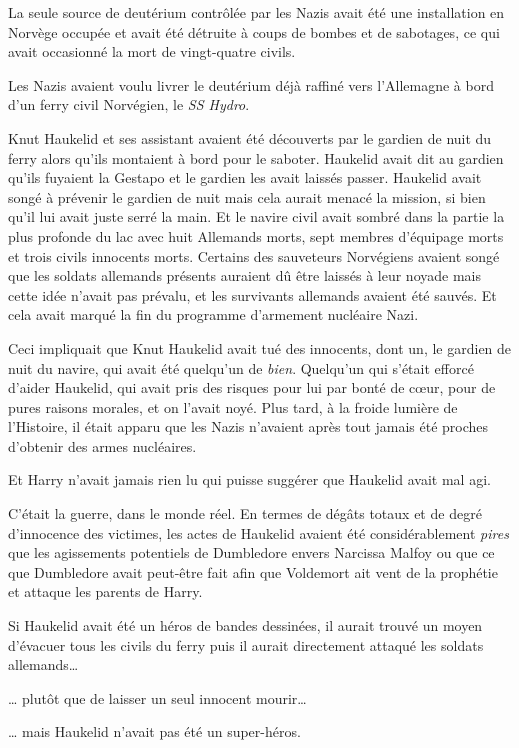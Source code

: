 La seule source de deutérium contrôlée par les Nazis avait été une installation en Norvège occupée et avait été détruite à coups de bombes et de sabotages, ce qui avait occasionné la mort de vingt-quatre civils.

Les Nazis avaient voulu livrer le deutérium déjà raffiné vers l'Allemagne à bord d'un ferry civil Norvégien, le \emph{SS Hydro}.

Knut Haukelid et ses assistant avaient été découverts par le gardien de nuit du ferry alors qu'ils montaient à bord pour le saboter. Haukelid avait dit au gardien qu'ils fuyaient la Gestapo et le gardien les avait laissés passer. Haukelid avait songé à prévenir le gardien de nuit mais cela aurait menacé la mission, si bien qu'il lui avait juste serré la main. Et le navire civil avait sombré dans la partie la plus profonde du lac avec huit Allemands morts, sept membres d'équipage morts et trois civils innocents morts. Certains des sauveteurs Norvégiens avaient songé que les soldats allemands présents auraient dû être laissés à leur noyade mais cette idée n'avait pas prévalu, et les survivants allemands avaient été sauvés. Et cela avait marqué la fin du programme d'armement nucléaire Nazi.

Ceci impliquait que Knut Haukelid avait tué des innocents, dont un, le gardien de nuit du navire, qui avait été quelqu'un de \emph{bien}. Quelqu'un qui s'était efforcé d'aider Haukelid, qui avait pris des risques pour lui par bonté de cœur, pour de pures raisons morales, et on l'avait noyé. Plus tard, à la froide lumière de l'Histoire, il était apparu que les Nazis n'avaient après tout jamais été proches d'obtenir des armes nucléaires.

Et Harry n'avait jamais rien lu qui puisse suggérer que Haukelid avait mal agi.

C'était la guerre, dans le monde réel. En termes de dégâts totaux et de degré d'innocence des victimes, les actes de Haukelid avaient été considérablement \emph{pires} que les agissements potentiels de Dumbledore envers Narcissa Malfoy ou que ce que Dumbledore avait peut-être fait afin que Voldemort ait vent de la prophétie et attaque les parents de Harry.

Si Haukelid avait été un héros de bandes dessinées, il aurait trouvé un moyen d'évacuer tous les civils du ferry puis il aurait directement attaqué les soldats allemands…

… plutôt que de laisser un seul innocent mourir…

… mais Haukelid n'avait pas été un super-héros.

